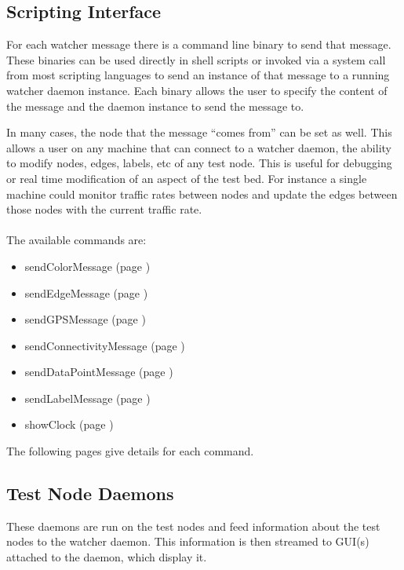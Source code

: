 \documentclass{article}
\begin{document}
\subsection{Scripting Interface}
For each watcher message there is a command line binary to send that message. These binaries can be used directly in shell scripts or invoked via a system call from most scripting languages to send 
an instance of that message to a running watcher daemon instance. Each binary allows the user to specify the content of the message and the daemon instance to send the message to. 

In many cases, the node that the message ``comes from'' can be set as well. This allows a user on any machine that can connect to a watcher daemon, the ability to modify nodes, edges, labels, etc of any 
test node. This is useful for debugging or real time modification of an aspect of the test bed. For instance a single machine could monitor traffic rates between nodes and update 
the edges between those nodes with the current traffic rate. 
\\\\
The available commands are:
\begin{itemize}
\item sendColorMessage (page \pageref{sendColorMessage})
\item sendEdgeMessage (page \pageref{sendEdgeMessage})
\item sendGPSMessage (page \pageref{sendGPSMessage})
\item sendConnectivityMessage (page \pageref{sendConnectivityMessage})
\item sendDataPointMessage (page \pageref{sendDataPointMessage})
\item sendLabelMessage (page \pageref{sendLabelMessage})
\item showClock (page \pageref{showClock})
\end{itemize}
The following pages give details for each command.








\subsection{Test Node Daemons}
These daemons are run on the test nodes and feed information about the test nodes to the watcher daemon. This information is then streamed to GUI(s) attached to the daemon, which display it.


\end{document}
